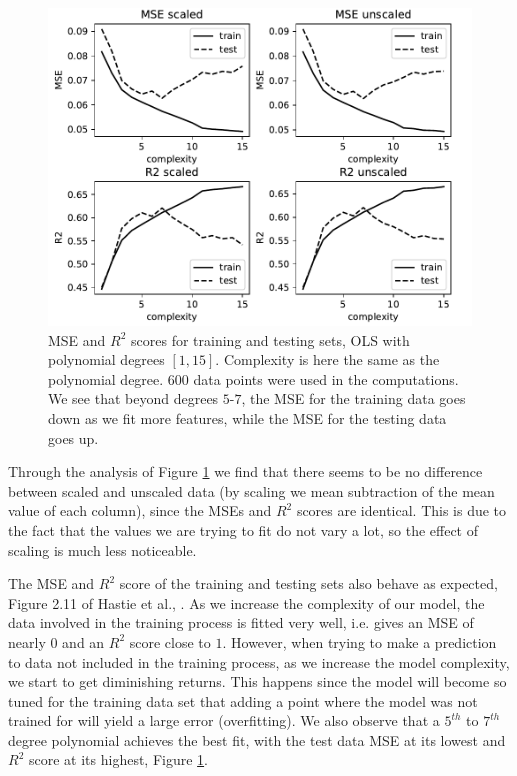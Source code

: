 \documentclass[10pt, a4paper]{article}
\begin{document}
    \begin{figure}[h]
        \centering
        \includegraphics[scale=0.7]{ex1_mse_r2_comp_600_noise_0.25.pdf}
        \caption{MSE and $R^2$ scores for training and testing sets, OLS with polynomial degrees $[1, 15]$. Complexity is here the same as the polynomial degree. $600$ data points were used in the computations. We see that beyond degrees $5$-$7$, the MSE for the training data goes down as we fit more features, while the MSE for the testing data goes up.}
        \label{fig:ex1-1}
    \end{figure}

    Through the analysis of Figure \ref{fig:ex1-1} we find that there seems to be no difference between scaled and unscaled data (by scaling we mean subtraction of the mean value of each column), since the MSEs and $R^2$ scores are identical. This is due to the fact that the values we are trying to fit do not vary a lot, so the effect of scaling is much less noticeable.
    
    The MSE and $R^2$ score of the training and testing sets also behave as expected, Figure 2.11 of Hastie et al., \cite{hastie}. As we increase the complexity of our model, the data involved in the training process is fitted very well, i.e. gives an MSE of nearly $0$ and an $R^2$ score close to $1$. However, when trying to make a prediction to data not included in the training process, as we increase the model complexity, we start to get diminishing returns. This happens since the model will become so tuned for the training data set that adding a point where the model was not trained for will yield a large error (overfitting). We also observe that a $5^{th}$ to $7^{th}$ degree polynomial achieves the best fit, with the test data MSE at its lowest and $R^2$ score at its highest, Figure \ref{fig:ex1-1}.
    
\end{document}
